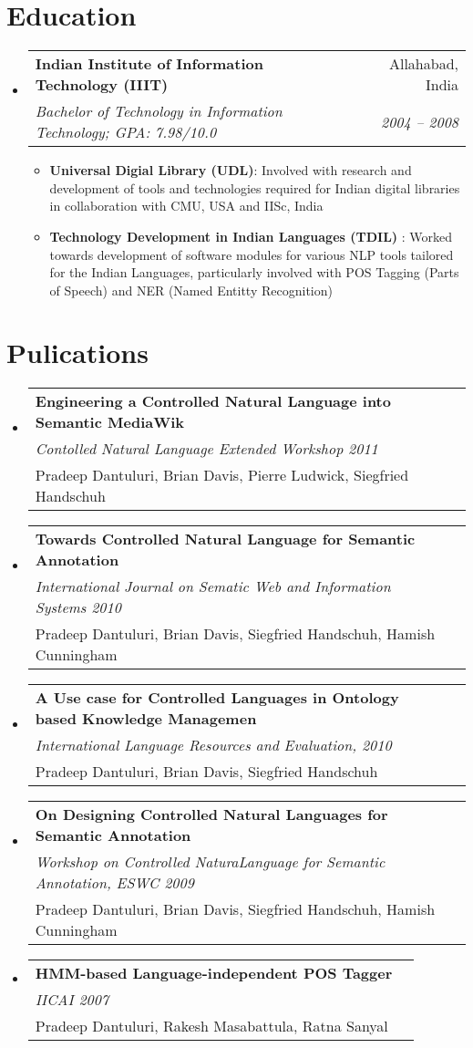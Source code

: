 \documentclass[letterpaper,11pt]{article}
\makeatletter
\newcommand{\resumeItem}[2]{
  \item\small{
    \textbf{#1}{: #2 \vspace{-2pt}}
  }
}
\newcommand{\resumeSubheading}[4]{
  \vspace{-1pt}\item
    \begin{tabular*}{0.97\textwidth}[t]{l@{\extracolsep{\fill}}r}
      \textbf{#1} & #2 \\
      \textit{\small#3} & \textit{\small #4} \\
    \end{tabular*}\vspace{-5pt}
}
\newcommand{\pubItem}[3]{
  \vspace{-1pt}\item
    \begin{tabular*}{0.97\textwidth}[t]{l@{\extracolsep{\fill}}r}
      \textbf{#1} &   \\
      \textit{\small#2} &   \\
      \small#3 &  \\
    \end{tabular*}\vspace{-5pt}
}
\newcommand{\resumeSubHeadingListStart}{\begin{itemize}[leftmargin=*]}
\newcommand{\resumeSubHeadingListEnd}{\end{itemize}}
\newcommand{\resumeItemListStart}{\begin{itemize}}
\newcommand{\resumeItemListEnd}{\end{itemize}\vspace{-5pt}}
\makeatother
\begin{document}
\section{Education}
  \resumeSubHeadingListStart
    \resumeSubheading
      {Indian Institute of Information Technology (IIIT) }{Allahabad, India}
      {Bachelor of Technology in Information Technology;  GPA: 7.98/10.0 }{ 2004 -- 2008}     
      \resumeItemListStart
        \resumeItem{Universal Digial Library (UDL)} 
          {Involved with research and development of tools and technologies required for Indian digital libraries in collaboration with CMU, USA and IISc, India}
        \resumeItem{Technology Development in Indian Languages (TDIL) }
          {Worked towards development of software modules for various NLP tools tailored for the Indian Languages, particularly involved with POS Tagging (Parts of Speech) and NER (Named Entitty Recognition)}
      \resumeItemListEnd
  \resumeSubHeadingListEnd


\section{Pulications}
  \resumeSubHeadingListStart
    \pubItem
      {Engineering a Controlled Natural Language into Semantic MediaWik}
      {Contolled Natural Language Extended Workshop 2011}
      { Pradeep Dantuluri, Brian Davis, Pierre Ludwick, Siegfried Handschuh}
    \pubItem
      {Towards Controlled Natural Language for Semantic Annotation }
      {International Journal on Sematic Web and Information Systems 2010 }
      { Pradeep Dantuluri, Brian Davis, Siegfried Handschuh, Hamish Cunningham}
    \pubItem
      {A Use case for Controlled Languages in Ontology based Knowledge Managemen }
      { International Language Resources and Evaluation, 2010 }
      { Pradeep Dantuluri, Brian Davis, Siegfried Handschuh}
    \pubItem
      {On Designing Controlled Natural Languages for Semantic Annotation  }
      {Workshop on Controlled NaturaLanguage for Semantic Annotation, ESWC 2009 }
      { Pradeep Dantuluri, Brian Davis, Siegfried Handschuh, Hamish Cunningham}
    \pubItem
      {HMM-based Language-independent POS Tagger }
      {IICAI 2007}
      {Pradeep Dantuluri, Rakesh Masabattula, Ratna Sanyal}
  \resumeSubHeadingListEnd





\end{document}
